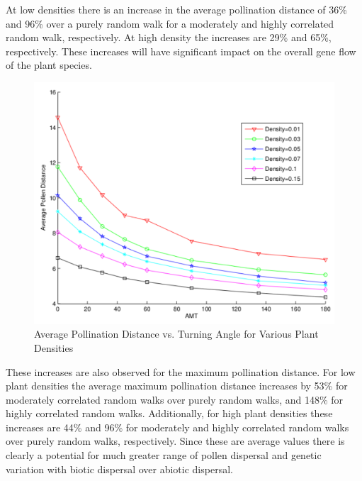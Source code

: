 At low densities there is an increase in the average pollination distance of
36\% and 96\% over a purely random walk for a moderately and highly correlated
random walk, respectively.  At high density the increases are 29\% and 65\%,
respectively.  These increases will have significant impact on the overall gene
flow of the plant species.

\begin{figure}
  \begin{center}
  \includegraphics[scale=0.5]{Figures/PollenDVsAMT.pdf}
  \end{center}
  \caption{\small Average Pollination Distance vs. Turning Angle for Various Plant Densities}
  \label{AvgDist}
\end{figure}

These increases are also observed for the maximum pollination distance.  For low
plant densities the average maximum pollination distance increases by 53\% for
moderately correlated random walks over purely random walks, and 148\% for
highly correlated random walks.  Additionally, for high plant densities these
increases are 44\% and 96\% for moderately and highly correlated random walks
over purely random walks, respectively.  Since these are average values there is
clearly a potential for much greater range of pollen dispersal and genetic
variation with biotic dispersal over abiotic dispersal.

